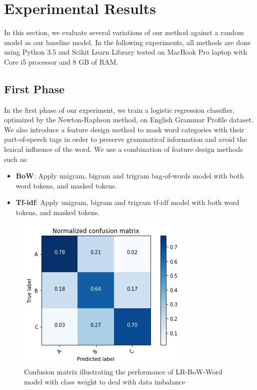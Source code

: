\section{Experimental Results}
\label{sec:exp}

In this section, we evaluate several variations of our method against a random model as our baseline model. In the following experiments, all methods are done using Python 3.5 and Scikit Learn Library tested on MacBook Pro laptop with Core i5 processor and 8 GB of RAM.

\subsection{First Phase}

In the first phase of our experiment, we train a logistic regression classifier, optimized by the Newton-Raphson method, on English Grammar Profile dataset. We also introduce a  feature design method to mask word categories with their part-of-speech tags in order to preserve grammatical information and avoid the lexical influence of the word. We use a combination of feature design methods such as:

\begin{itemize}
    \item \textbf{BoW}: Apply unigram, bigram and trigram bag-of-words model with both word tokens, and masked tokens.
    \item \textbf{Tf-idf}: Apply unigram, bigram and trigram tf-idf model with both word tokens, and masked tokens.
\end{itemize}


\begin{figure}[t]
    \centering
    \includegraphics[width=.75\linewidth]{../Figures/conf_matrix_iter1.png} 
    \caption{Confusion matrix illustrating the performance of LR-BoW-Word model with class weight to deal with data imbalance}
    \label{fig:cmdstudy}
\end{figure}

